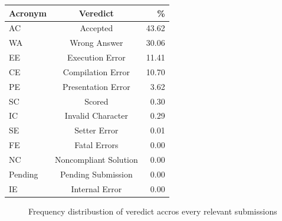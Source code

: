 \documentclass[../main.tex]{subfiles}
\begin{document}
\begin{center}
\begin{tabular}{lcr}
\toprule
 Acronym &               Veredict &     \% \\
\midrule
      AC &               Accepted &   43.62 \\
      WA &           Wrong Answer &   30.06 \\
      EE &        Execution Error &   11.41 \\
      CE &      Compilation Error &   10.70 \\
      PE &     Presentation Error &    3.62 \\
      SC &                 Scored &    0.30 \\
      IC &      Invalid Character &    0.29 \\
      SE &           Setter Error &    0.01 \\
      FE &           Fatal Errors &    0.00 \\
      NC &  Noncompliant Solution &    0.00 \\
 Pending &     Pending Submission &    0.00 \\
      IE &         Internal Error &    0.00 \\
\bottomrule
\end{tabular}
\end{center}

\begin{figure}[h]
\centering
{}
\caption[Veredict distribution]{Frequency distribustion of veredict accros every relevant submissions}
\label{fig:veredict_distrib}
\end{figure}
\end{document}
